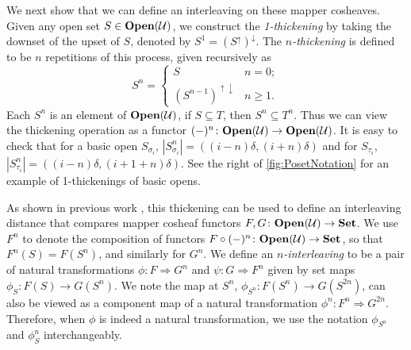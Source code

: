We next show that we can define an interleaving on these mapper cosheaves.
Given any open set $S \in \mathbf{Open}(\mathcal{U})$, we construct the \emph{1-thickening} by taking the downset of the upset of $S$, denoted by
$S^1 = (S^{\uparrow})^\downarrow$.
The \emph{$n$-thickening} is defined to be $n$ repetitions of this process, given recursively as
\begin{equation*}
    S^n = 
    \begin{cases}
    S & n = 0;\\
    (S^{n-1})^{\uparrow\downarrow} & n \geq 1.
    \end{cases}
\end{equation*}
Each $S^n$ is an element of $\mathbf{Open}(\mathcal{U})$, if $S \subseteq T$, then $S^n \subseteq T^n$. 
Thus we can view the thickening operation as a functor $(-)^n\colon \mathbf{Open}(\mathcal{U})   \to   \mathbf{Open}(\mathcal{U})$.
It is easy to check  that for a basic open $S_{\sigma_i}$, $|S_{\sigma_i}^n| = ((i-n)\delta, (i+n)\delta)$ and for $S_{\tau_i}$, $|S_{\tau_i}^n| = ((i-n)\delta, (i+1+n)\delta)$. 
See the right of \cref{fig:PosetNotation} for an example of 1-thickenings of basic opens.

As shown in previous work \cite{chambers2023bounding}, this thickening can be used to define an interleaving distance that compares mapper cosheaf functors  
${F,G\colon\mathbf{Open}(\mathcal{U}) \to \mathbf{Set}}$.
We use $F^n$ to denote the composition of functors $F \circ ( - )^n\colon \mathbf{Open}(\mathcal{U}) \to \mathbf{Set}$, so that $F^n(S) = F(S^n)$, and similarly for $G^n$. 
We define an \emph{$n$-interleaving} to be a pair of natural transformations $\phi\colon F \Rightarrow G^n$ and $\psi\colon G \Rightarrow F^n$ given by set maps $\phi_S\colon F(S) \to G(S^n)$. 
We note the map at $S^n$, $\phi_{S^n}\colon F(S^n) \to G(S^{2n})$, can also be viewed as a component map of a natural transformation $\phi^n\colon F^n \Rightarrow G^{2n}$. Therefore, when $\phi$ is indeed a natural transformation, we use the notation $\phi_{S^n}$ and $\phi_S^n$ interchangeably.


